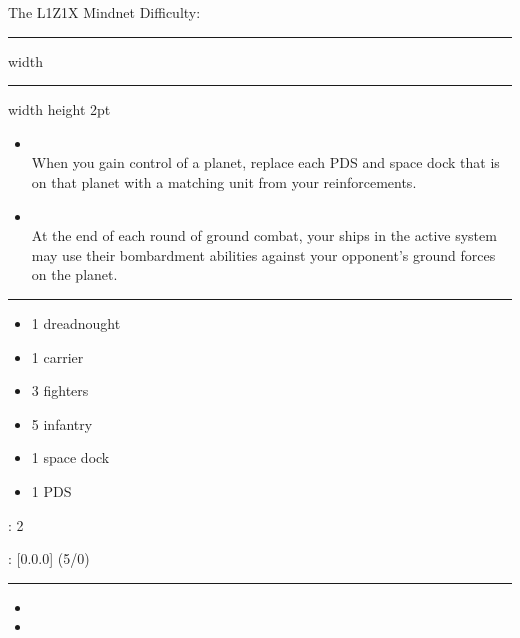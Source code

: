 \newpage
{\handel\Huge The L1Z1X Mindnet} \hfill {\Large Difficulty: \easy} \vspace{-4pt}\\
\hrule width \hsize \kern 1mm \hrule width \hsize height 2pt


\begin{multicols}{2}


\begin{itemize}
\item {}\\
When you gain control of a planet, replace each PDS and space dock that is on that planet with a matching unit from your reinforcements.
\item {}\\
At the end of each round of ground combat, your ships in the active system may use their bombardment abilities against your opponent's ground forces on the planet.
\end{itemize}


\vspace{-10pt}\rule{\hsize}{0.4pt}\vspace{5pt}


\vspace{-5pt}
\begin{multicols}{2}
\begin{itemize}
\item 1 dreadnought
\item 1 carrier
\item 3 fighters
\item 5 infantry
\item 1 space dock
\item 1 PDS
\end{itemize}
\end{multicols}

\vspace{-5pt}
: 2

\vspace{2pt}
: [0.0.0] (5/0)

\rule{\hsize}{0.4pt}\vspace{5pt}


\begin{itemize}
\item \neural
\item \plasma
\end{itemize}


\end{multicols}
